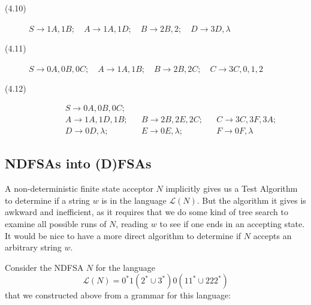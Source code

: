 \documentclass{article}
\newcommand{\El}{\mathcal L}
\begin{document}
\begin{description}
  \item[(4.10)] $S \to 1A,1B; \quad A \to 1A,1D; \quad B \to 2B,2; \quad D \to 3D,\lambda$ 
  \item[(4.11)] $S \to 0A,0B,0C; \quad A \to 1A,1B; \quad B \to 2B,2C; \quad C \to 3C,0,1,2$
  \item[(4.12)] 
    \begin{align*}
    & S \to 0A,0B,0C; \\
    & A \to 1A,1D,1B;   & & B \to 2B,2E,2C;   & & C \to 3C,3F,3A; \\
    & D \to 0D,\lambda; & & E \to 0E,\lambda; & & F \to 0F,\lambda
    \end{align*}
\end{description}


\subsection{NDFSAs into (D)FSAs} %


A non-deterministic finite state acceptor $N$ implicitly gives us a Test Algorithm to determine if a string $w$ is in the language $\El(N)$. But the algorithm it gives is awkward and inefficient, as it requires that we do some kind of tree search to examine all possible runs of $N$, reading $w$ to see if one ends in an accepting state. It would be nice to have a more direct algorithm to determine if $N$ accepts an arbitrary string $w$.

Consider the NDFSA $N$ for the language
\begin{equation*}
\El(N) = 0^* 1 (2^* \cup 3^*) 0 (11^* \cup 222^*)
\end{equation*}
that we constructed above from a grammar for this language:
\end{document}
